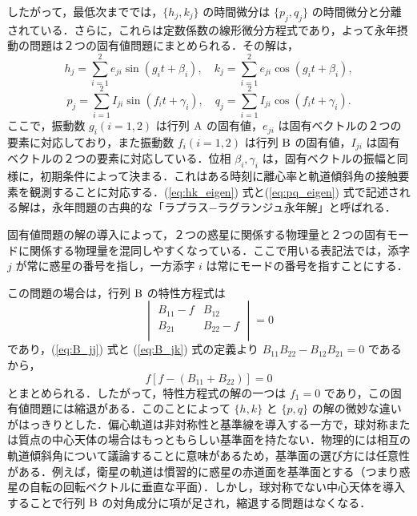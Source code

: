 \documentclass[11pt,a4paper,oneside,onecolumn]{jreport}
\begin{document}
したがって，最低次まででは，$\{ h_j, k_j \}$ の時間微分は $\{ p_j, q_j \}$ の時間微分と分離されている．さらに，これらは定数係数の線形微分方程式であり，よって永年摂動の問題は２つの固有値問題にまとめられる．その解は，
\begin{equation}
h_j = \sum_{i = 1}^2 e_{ji} \sin (g_i t + \beta_i), \quad k_j = \sum_{i=1}^2 e_{ji} \cos (g_i t + \beta_i), \label{eq:hk_eigen}
\end{equation}
\begin{equation}
p_j = \sum_{i = 1}^2 I_{ji} \sin (f_i t + \gamma_i), \quad q_j = \sum_{i=1}^2 I_{ji} \cos (f_i t + \gamma_i). \label{eq:pq_eigen}
\end{equation}
ここで，振動数 $g_i (i = 1, 2)$ は行列 ${\rm A}$ の固有値，$e_{ji}$ は固有ベクトルの２つの要素に対応しており，また振動数 $f_i (i = 1, 2)$ は行列 ${\rm B}$ の固有値，$I_{ji}$ は固有ベクトルの２つの要素に対応している．位相 $\beta_i, \gamma_i$ は，固有ベクトルの振幅と同様に，初期条件によって決まる．これはある時刻に離心率と軌道傾斜角の接触要素を観測することに対応する．(\ref{eq:hk_eigen}) 式と(\ref{eq:pq_eigen}) 式で記述される解は，永年問題の古典的な「ラプラス−ラグランジュ永年解」と呼ばれる．

固有値問題の解の導入によって，２つの惑星に関係する物理量と２つの固有モードに関係する物理量を混同しやすくなっている．ここで用いる表記法では，添字 $j$ が常に惑星の番号を指し，一方添字 $i$ は常にモードの番号を指すことにする．

この問題の場合は，行列 ${\rm B}$ の特性方程式は
\begin{equation}
\begin{vmatrix}
B_{11} - f & B_{12} \\
B_{21} & B_{22} - f \\
\end{vmatrix}
= 0
\end{equation}
であり，(\ref{eq:B_jj}) 式と (\ref{eq:B_jk}) 式の定義より $B_{11} B_{22} - B_{12} B_{21} = 0$ であるから，
\begin{equation}
f \left[ f - (B_{11} + B_{22}) \right] = 0
\end{equation}
とまとめられる．したがって，特性方程式の解の一つは $f_1 = 0$ であり，この固有値問題には縮退がある．このことによって $\{ h, k \}$ と $\{ p, q \}$ の解の微妙な違いがはっきりとした．偏心軌道は非対称性と基準線を導入する一方で，球対称または質点の中心天体の場合はもっともらしい基準面を持たない．物理的には相互の軌道傾斜角について議論することに意味があるため，基準面の選び方には任意性がある．例えば，衛星の軌道は慣習的に惑星の赤道面を基準面とする（つまり惑星の自転の回転ベクトルに垂直な平面）．しかし，球対称でない中心天体を導入することで行列 ${\rm B}$ の対角成分に項が足され，縮退する問題はなくなる． 
\end{document}
